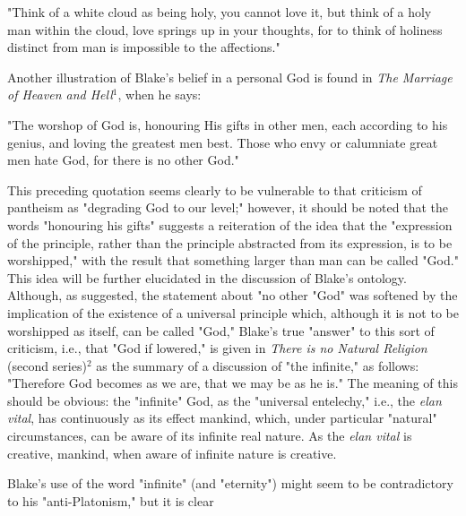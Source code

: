 \begin{center}
	\parbox{0.8\textwidth}{
		\hspace*{5mm}"Think of a white cloud as being holy, you cannot love it, but
		think of a holy man within the cloud, love springs up in your thoughts, for to 
		think of holiness distinct from man is impossible to the affections."\par
	}%
\end{center}
\hspace*{5mm}Another illustration of Blake's belief in a personal God is found in \textit{The Marriage of Heaven and Hell}$^{1}$, when he says:\par
\begin{center}
	\parbox{0.8\textwidth}{
		\hspace*{5mm}"The worshop of God is, honouring His gifts in other men, each according to 
		his genius, and loving the greatest men best. Those who envy or calumniate great men hate
		God, for there is no other God."\par
	}%
\end{center}
\hspace*{5mm}This preceding quotation seems clearly to be vulnerable to that criticism of pantheism as "degrading 
God to our level;" however, it should be noted that the words "honouring his
gifts" suggests a reiteration of the idea that the "expression of the principle, rather than
the principle abstracted from its expression, is to be worshipped," with the result that 
something larger than man can be called "God." This idea will be further elucidated in the discussion
of Blake's ontology. Although, as suggested, the statement about "no other "God" was softened by the implication
of the existence of a universal principle which, although it is not to be worshipped as itself, can be called "God," Blake's
true "answer" to this sort of criticism, i.e., that "God if lowered," is given in \textit{There is no Natural Religion} (second series)$^{2}$
as the summary of a discussion of "the infinite," as follows: "Therefore God becomes as we are, that we may be as he is." The meaning of this
should be obvious: the "infinite" God, as the "universal entelechy," i.e., the \textit{elan vital}, has continuously
as its effect mankind, which, under particular "natural" circumstances, can be aware of its infinite real nature. As the \textit{elan vital}
is creative, mankind, when aware of infinite nature is creative.\par
\vspace*{0.5\baselineskip}
Blake's use of the word "infinite" (and "eternity") might seem to be contradictory to his "anti-Platonism," but it is clear
